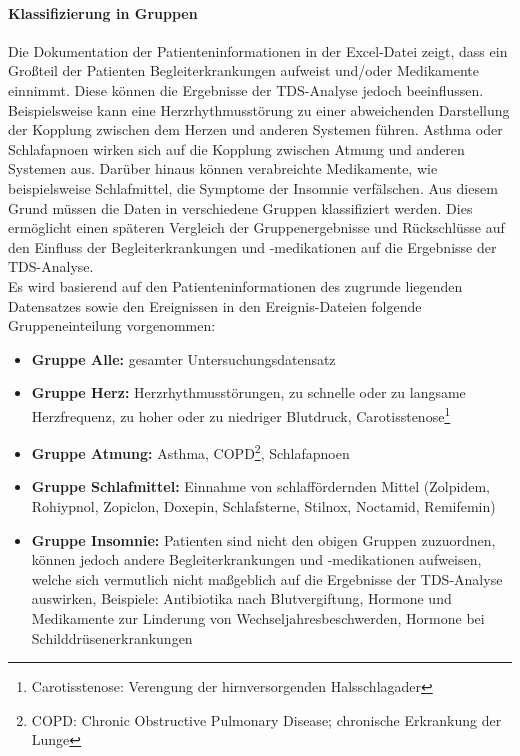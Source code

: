 \paragraph{Klassifizierung in Gruppen}
Die Dokumentation der Patienteninformationen in der Excel-Datei zeigt, dass ein Großteil der Patienten Begleiterkrankungen aufweist und/oder Medikamente einnimmt. Diese können die Ergebnisse der \acs{TDS}-Analyse jedoch beeinflussen. Beispielsweise kann eine Herzrhythmusstörung zu einer abweichenden Darstellung der Kopplung zwischen dem Herzen und anderen Systemen führen. Asthma oder Schlafapnoen wirken sich auf die Kopplung zwischen Atmung und anderen Systemen aus. Darüber hinaus können verabreichte Medikamente, wie beispielsweise Schlafmittel, die Symptome der Insomnie verfälschen. Aus diesem Grund müssen die Daten in verschiedene Gruppen klassifiziert werden. Dies ermöglicht einen späteren Vergleich der Gruppenergebnisse und Rückschlüsse auf den Einfluss der Begleiterkrankungen und -medikationen auf die Ergebnisse der \acs{TDS}-Analyse.\\

Es wird basierend auf den Patienteninformationen des zugrunde liegenden Datensatzes sowie den Ereignissen in den Ereignis-Dateien folgende Gruppeneinteilung vorgenommen:

\begin{itemize}
\item \textbf{Gruppe Alle:} gesamter Untersuchungsdatensatz
\item \textbf{Gruppe Herz:} Herzrhythmusstörungen, zu schnelle oder zu langsame Herzfrequenz, zu hoher oder zu niedriger Blutdruck, Carotisstenose\footnote{Carotisstenose: Verengung der hirnversorgenden Halsschlagader}
\item \textbf{Gruppe Atmung:} Asthma, COPD\footnote{COPD: Chronic Obstructive Pulmonary Disease; chronische Erkrankung der Lunge}, Schlafapnoen
\item \textbf{Gruppe Schlafmittel:} Einnahme von schlaffördernden Mittel (Zolpidem, Rohiypnol, Zopiclon, Doxepin, Schlafsterne, Stilnox, Noctamid, Remifemin)
\item \textbf{Gruppe Insomnie:} Patienten sind nicht den obigen Gruppen zuzuordnen, können jedoch andere Begleiterkrankungen und -medikationen aufweisen, welche sich vermutlich nicht maßgeblich auf die Ergebnisse der \acs{TDS}-Analyse auswirken, Beispiele: Antibiotika nach Blutvergiftung, Hormone und Medikamente zur Linderung von Wechseljahresbeschwerden, Hormone bei Schilddrüsenerkrankungen
\end{itemize}


